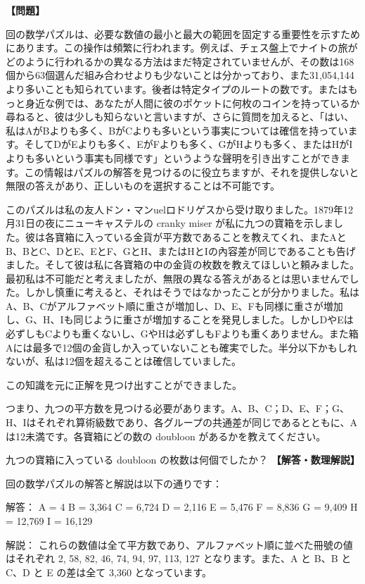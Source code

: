 \documentclass[10pt,a4paper,oneside,openany]{ltjsbook}
\begin{document}
\begin{tcolorbox}[colback=softblue,colframe=primaryblue,title=\textbf{第 132 問：THE NINE TREASURE BOXES.},arc=2mm,boxrule=1pt,breakable]
\textbf{【問題】}\par\vspace{0.3em}
回の数学パズルは、必要な数値の最小と最大の範囲を固定する重要性を示すためにあります。この操作は頻繁に行われます。例えば、チェス盤上でナイトの旅がどのように行われるかの異なる方法はまだ特定されていませんが、その数は168個から63個選んだ組み合わせよりも少ないことは分かっており、また31,054,144より多いことも知られています。後者は特定タイプのルートの数です。またはもっと身近な例では、あなたが人間に彼のポケットに何枚のコインを持っているか尋ねると、彼は少しも知らないと言いますが、さらに質問を加えると、「はい、私はAがBよりも多く、BがCよりも多いという事実については確信を持っています。そしてDがEよりも多く、EがFよりも多く、GがHよりも多く、またはHがIよりも多いという事実も同様です」というような聲明を引き出すことができます。この情報はパズルの解答を見つけるのに役立ちますが、それを提供しないと無限の答えがあり、正しいものを選択することは不可能です。

このパズルは私の友人ドン・マンuelロドリゲスから受け取りました。1879年12月31日の夜にニューキャステルの cranky miser が私に九つの寶箱を示しました。彼は各寶箱に入っている金貨が平方数であることを教えてくれ、またAとB、BとC、DとE、EとF、GとH、またはHとIの內容差が同じであることも告げました。そして彼は私に各寶箱の中の金貨の枚数を教えてほしいと頼みました。最初私は不可能だと考えましたが、無限の異なる答えがあるとは思いませんでした。しかし慎重に考えると、それはそうではなかったことが分かりました。私はA、B、Cがアルファベット順に重さが増加し、D、E、Fも同様に重さが増加し、G、H、Iも同じように重さが増加することを発見しました。しかしDやEは必ずしもCよりも重くないし、GやHは必ずしもFよりも重くありません。また箱Aには最多で12個の金貨しか入っていないことも確実でした。半分以下かもしれないが、私は12個を超えることは確信していました。

この知識を元に正解を見つけ出すことができました。

つまり、九つの平方数を見つける必要があります。A、B、C；D、E、F；G、H、Iはそれぞれ算術級数であり、各グループの共通差が同じであるとともに、Aは12未満です。各寶箱にどの数の doubloon があるかを教えてください。

九つの寶箱に入っている doubloon の枚数は何個でしたか？
\tcblower
\textbf{【解答・数理解説】}\par\vspace{0.3em}
回の数学パズルの解答と解説は以下の通りです：

解答：
A = 4         B = 3,364      C = 6,724
D = 2,116     E = 5,476      F = 8,836
G = 9,409     H = 12,769     I = 16,129

解説：
これらの数値は全て平方数であり、アルファベット順に並べた冊號の値はそれぞれ 2, 58, 82, 46, 74, 94, 97, 113, 127 となります。また、A と B、B と C、D と E の差は全て 3,360 となっています。
\end{tcolorbox}
\end{document}
